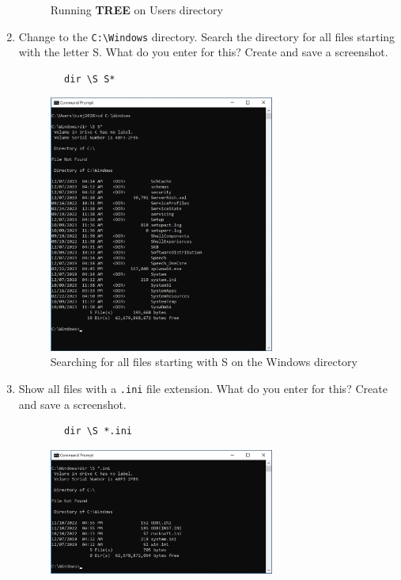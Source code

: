 \documentclass[12pt]{article}
\newenvironment{problem}[2][Problem]{\begin{trivlist}
\item[\hskip \labelsep {\bfseries #1}\hskip \labelsep {\bfseries #2.}]}{\end{trivlist}}
\begin{document}
\begin{problem}{1}
\begin{enumerate}
\begin{figure}[H]
        \caption{Running \textbf{TREE} on Users directory}
    \end{figure}
    \item Change to the \verb|C:\Windows| directory. Search the directory for all files starting with the letter S. What do you enter for this? Create and save a screenshot.
    \begin{verbatim}
        dir \S S*
    \end{verbatim}
    \begin{figure}[H]
        \centering
        \includegraphics[width=0.7\textwidth]{dir}
        \caption{Searching for all files starting with S on the Windows directory}
    \end{figure}
    \pagebreak
    \item Show all files with a \verb|.ini| file extension. What do you enter for this? Create and save a screenshot.
    \begin{verbatim}
        dir \S *.ini
    \end{verbatim}
    \begin{figure}[H]
        \centering
        \includegraphics[width=0.7\textwidth]{ini}

\end{figure}
\end{enumerate}
\end{problem}
\end{document}

